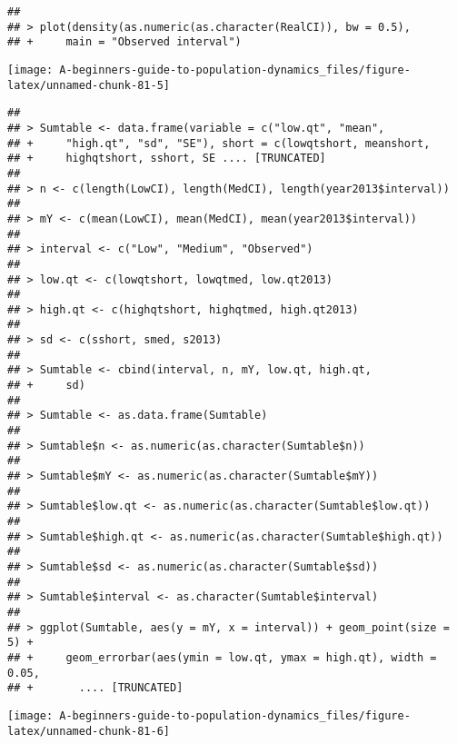 \documentclass[]{book}
\begin{document}
\begin{verbatim}
## 
## > plot(density(as.numeric(as.character(RealCI)), bw = 0.5), 
## +     main = "Observed interval")
\end{verbatim}

\begin{center}\texttt{[image: A-beginners-guide-to-population-dynamics\_files/figure-latex/unnamed-chunk-81-5]} \end{center}

\begin{verbatim}
## 
## > Sumtable <- data.frame(variable = c("low.qt", "mean", 
## +     "high.qt", "sd", "SE"), short = c(lowqtshort, meanshort, 
## +     highqtshort, sshort, SE .... [TRUNCATED] 
## 
## > n <- c(length(LowCI), length(MedCI), length(year2013$interval))
## 
## > mY <- c(mean(LowCI), mean(MedCI), mean(year2013$interval))
## 
## > interval <- c("Low", "Medium", "Observed")
## 
## > low.qt <- c(lowqtshort, lowqtmed, low.qt2013)
## 
## > high.qt <- c(highqtshort, highqtmed, high.qt2013)
## 
## > sd <- c(sshort, smed, s2013)
## 
## > Sumtable <- cbind(interval, n, mY, low.qt, high.qt, 
## +     sd)
## 
## > Sumtable <- as.data.frame(Sumtable)
## 
## > Sumtable$n <- as.numeric(as.character(Sumtable$n))
## 
## > Sumtable$mY <- as.numeric(as.character(Sumtable$mY))
## 
## > Sumtable$low.qt <- as.numeric(as.character(Sumtable$low.qt))
## 
## > Sumtable$high.qt <- as.numeric(as.character(Sumtable$high.qt))
## 
## > Sumtable$sd <- as.numeric(as.character(Sumtable$sd))
## 
## > Sumtable$interval <- as.character(Sumtable$interval)
## 
## > ggplot(Sumtable, aes(y = mY, x = interval)) + geom_point(size = 5) + 
## +     geom_errorbar(aes(ymin = low.qt, ymax = high.qt), width = 0.05, 
## +       .... [TRUNCATED]
\end{verbatim}

\begin{center}\texttt{[image: A-beginners-guide-to-population-dynamics\_files/figure-latex/unnamed-chunk-81-6]} \end{center}
\end{document}
